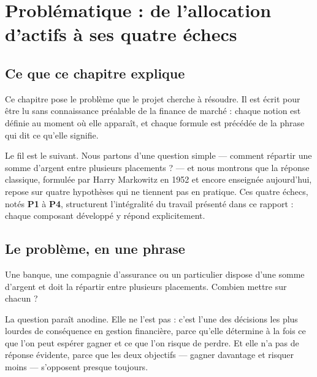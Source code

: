 %

\chapter{Problématique : de l'allocation d'actifs à ses quatre échecs}
\label{chap:problematique}

\section*{Ce que ce chapitre explique}

Ce chapitre pose le problème que le projet cherche à résoudre. Il est écrit pour
être lu sans connaissance préalable de la finance de marché : chaque notion est
définie au moment où elle apparaît, et chaque formule est précédée de la phrase
qui dit ce qu'elle signifie.

Le fil est le suivant. Nous partons d'une question simple — comment répartir une
somme d'argent entre plusieurs placements ? — et nous montrons que la réponse
classique, formulée par Harry Markowitz en 1952 et encore enseignée aujourd'hui,
repose sur quatre hypothèses qui ne tiennent pas en pratique. Ces quatre échecs,
notés \textbf{P1} à \textbf{P4}, structurent l'intégralité du travail présenté
dans ce rapport : chaque composant développé y répond explicitement.

\section{Le problème, en une phrase}

Une banque, une compagnie d'assurance ou un particulier dispose d'une somme
d'argent et doit la répartir entre plusieurs placements. Combien mettre sur
chacun ?

La question paraît anodine. Elle ne l'est pas : c'est l'une des décisions les
plus lourdes de conséquence en gestion financière, parce qu'elle détermine à la
fois ce que l'on peut espérer gagner et ce que l'on risque de perdre. Et elle
n'a pas de réponse évidente, parce que les deux objectifs — gagner davantage et
risquer moins — s'opposent presque toujours.


